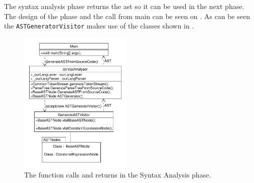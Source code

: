 The syntax analysis phase returns the \acrshort{ast} so it can be used in the next phase. 
The design of the phase and the call from main can be seen on .
As can be seen the \texttt{ASTGeneratorVisitor} makes use of the classes shown in .

\begin{figure}[ht]
  \centering
    \includegraphics[width=0.48\textwidth]{figures/ClassDiagrams/SyntaxAnalyser.pdf}
  \caption{The function calls and returns in the Syntax Analysis phase.}
  \label{fig:syntaxphase}
\end{figure}